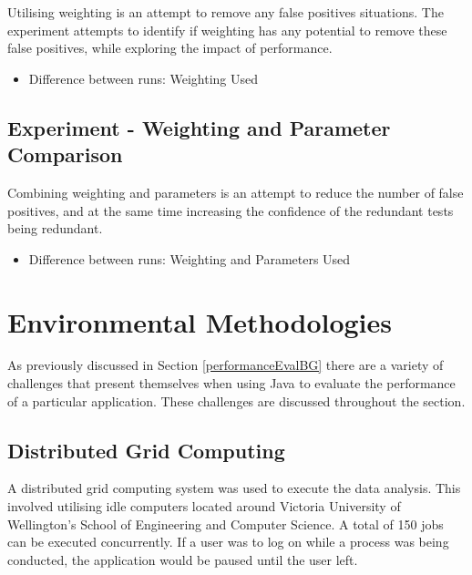 Utilising weighting is an attempt to remove any false positives situations. The experiment attempts to identify if weighting has any potential to remove these false positives, while exploring the impact of performance.

\begin{itemize}
\item Difference between runs: Weighting Used
\end{itemize}

\subsection{Experiment  - Weighting and Parameter Comparison}

Combining weighting and parameters is an attempt to reduce the number of false positives, and at the same time increasing the confidence of the redundant tests being redundant. 

\begin{itemize}
\item Difference between runs: Weighting and Parameters Used
\end{itemize}

\section{Environmental Methodologies}
\label{enviro}
As previously discussed in Section \ref{performanceEvalBG} there are a variety of challenges that present themselves when using Java to evaluate the performance of a particular application. These challenges are discussed throughout the section.

\subsection{Distributed Grid Computing}
 A distributed grid computing system was used to execute the data analysis. This involved utilising idle computers located around Victoria University of Wellington's School of Engineering and Computer Science. A total of 150 jobs can be executed concurrently. If a user was to log on while a process was being conducted, the application would be paused until the user left.

